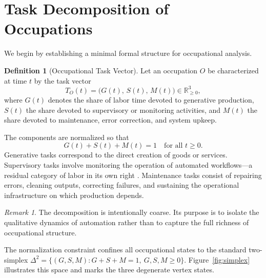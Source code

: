 \documentclass[12pt,a4paper]{article}
\theoremstyle{plain}
\theoremstyle{definition}
\newtheorem{definition}[theorem]{Definition}
\theoremstyle{remark}
\newtheorem{remark}[theorem]{Remark}
\begin{document}
\section{Task Decomposition of Occupations}
\label{sec:decomp}

We begin by establishing a minimal formal structure for occupational analysis.

\begin{definition}[Occupational Task Vector]
Let an occupation $O$ be characterized at time $t$ by the task vector
\[
T_O(t) = \bigl(G(t),\, S(t),\, M(t)\bigr) \in \mathbb{R}_{\geq 0}^3,
\]
where $G(t)$ denotes the share of labor time devoted to generative production,
$S(t)$ the share devoted to supervisory or monitoring activities, and $M(t)$
the share devoted to maintenance, error correction, and system upkeep.
\end{definition}

The components are normalized so that
\[
G(t) + S(t) + M(t) = 1 \quad \text{for all } t \geq 0.
\]
Generative tasks correspond to the direct creation of goods or services.
Supervisory tasks involve monitoring the operation of automated
workflows---a residual category of labor in its own right
\cite{zuboff1988}.  Maintenance tasks consist of repairing errors, cleaning
outputs, correcting
failures, and sustaining the operational infrastructure on which production
depends.

\begin{remark}
The decomposition is intentionally coarse.  Its purpose is to isolate the
qualitative dynamics of automation rather than to capture the full richness
of occupational structure.
\end{remark}
The normalization constraint confines all occupational states to the
standard two-simplex $\Delta^2 = \{(G,S,M) : G+S+M=1,\ G,S,M\geq 0\}$.
Figure~\ref{fig:simplex} illustrates this space and marks the three
degenerate vertex states.
\end{document}
